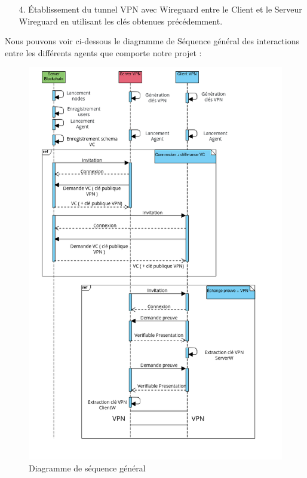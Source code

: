 \documentclass[12pt, openany]{report}
\begin{document}
\begin{flushleft}
\begin{itemize}
\color{red}
\item[4.] \color{black} Établissement du tunnel VPN avec Wireguard entre le Client et le Serveur Wireguard en utilisant les clés obtenues précédemment.

\end{itemize}

Nous pouvons voir ci-dessous le diagramme de Séquence général des interactions entre  les différents agents que comporte notre projet :
\begin{figure}[H]
	\includegraphics[scale=0.4]{sequence.png}
	\centering
	\caption{Diagramme de séquence général}
\end{figure}

\end{flushleft}
\end{document}
